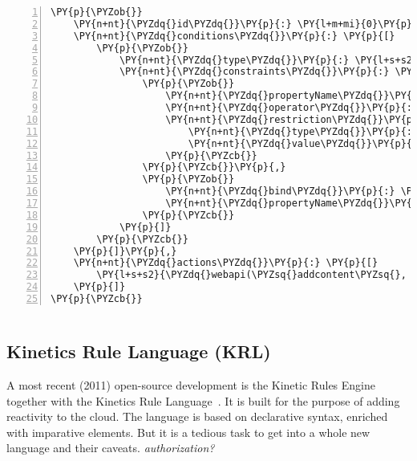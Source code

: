 \begin{Verbatim}[frame=single,fontsize=\footnotesize,commandchars=\\\{\},numbers=left,firstnumber=1,stepnumber=1,xleftmargin
=.3in]
\PY{p}{\PYZob{}}
    \PY{n+nt}{\PYZdq{}id\PYZdq{}}\PY{p}{:} \PY{l+m+mi}{0}\PY{p}{,}
    \PY{n+nt}{\PYZdq{}conditions\PYZdq{}}\PY{p}{:} \PY{p}{[}
        \PY{p}{\PYZob{}}
            \PY{n+nt}{\PYZdq{}type\PYZdq{}}\PY{p}{:} \PY{l+s+s2}{\PYZdq{}email\PYZdq{}}\PY{p}{,}
            \PY{n+nt}{\PYZdq{}constraints\PYZdq{}}\PY{p}{:} \PY{p}{[}
                \PY{p}{\PYZob{}}
                    \PY{n+nt}{\PYZdq{}propertyName\PYZdq{}}\PY{p}{:} \PY{l+s+s2}{\PYZdq{}sender\PYZdq{}}\PY{p}{,}
                    \PY{n+nt}{\PYZdq{}operator\PYZdq{}}\PY{p}{:} \PY{l+s+s2}{\PYZdq{}EQ\PYZdq{}}\PY{p}{,}
                    \PY{n+nt}{\PYZdq{}restriction\PYZdq{}}\PY{p}{:} \PY{p}{\PYZob{}}
                        \PY{n+nt}{\PYZdq{}type\PYZdq{}}\PY{p}{:} \PY{l+s+s2}{\PYZdq{}String\PYZdq{}}\PY{p}{,}
                        \PY{n+nt}{\PYZdq{}value\PYZdq{}}\PY{p}{:} \PY{l+s+s2}{\PYZdq{}sender@mail.com\PYZdq{}}
                    \PY{p}{\PYZcb{}}
                \PY{p}{\PYZcb{}}\PY{p}{,}
                \PY{p}{\PYZob{}}
                    \PY{n+nt}{\PYZdq{}bind\PYZdq{}}\PY{p}{:} \PY{l+s+s2}{\PYZdq{}\PYZdl{}S\PYZdq{}}\PY{p}{,}
                    \PY{n+nt}{\PYZdq{}propertyName\PYZdq{}}\PY{p}{:} \PY{l+s+s2}{\PYZdq{}subject\PYZdq{}}
                \PY{p}{\PYZcb{}}
            \PY{p}{]}
        \PY{p}{\PYZcb{}}
    \PY{p}{]}\PY{p}{,}
    \PY{n+nt}{\PYZdq{}actions\PYZdq{}}\PY{p}{:} \PY{p}{[}
        \PY{l+s+s2}{\PYZdq{}webapi(\PYZsq{}addcontent\PYZsq{}, \PYZdl{}S)\PYZdq{}}
    \PY{p}{]}
\PY{p}{\PYZcb{}}
\end{Verbatim}
\begin{lstlisting}[caption=E-Mail Example rule in JSON Rules]
\end{lstlisting}


\subsection{Kinetics Rule Language (KRL)}
A most recent (2011) open-source development is the Kinetic Rules Engine together with the Kinetics Rule Language~\cite{bookTheLiveWeb}.
It is built for the purpose of adding reactivity to the cloud.
The language is based on declarative syntax, enriched with imparative elements.
But it is a tedious task to get into a whole new language and their caveats.
\emph{authorization?}


